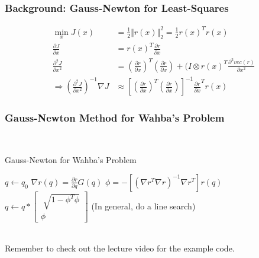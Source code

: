 \subsubsection{Background: Gauss-Newton for Least-Squares}
\begin{align}
    \min_x J(x) & = \frac{1}{2} \Vert r(x) \Vert_2^2 = \frac{1}{2}r(x)^T r(x) \\
    \frac{\partial J}{\partial x} & = r(x)^T \frac{\partial r}{\partial x} \\ 
    \frac{\partial^2 J}{\partial x^2} & = (\frac{\partial r}{\partial x})^T (\frac{\partial r}{\partial x}) + (I \otimes r(x)^T \frac{\partial^2 vec(r)}{\partial x^2} \\
    \Rightarrow (\frac{\partial^2 J}{\partial x^2})^{-1} \nabla J & \approx [(\frac{\partial r}{\partial x})^T (\frac{\partial r}{\partial x})]^{-1} \frac{\partial r}{\partial x}^T r(x)
\end{align}

\subsubsection{Gauss-Newton Method for Wahba's Problem}

\\
\noindent
\begin{algorithm}
	\caption{Gauss-Newton for Wahba's Problem}
	\label{alg:ForwardRollout}
	\begin{algorithmic}[1]	
        \State $q \gets q_0$
            \State $\nabla r(q) = \frac{\partial r}{\partial q} G(q)$ 
            \State $\phi = -[(\nabla r^T \nabla r)^{-1} \nabla r^T] r(q)$
            \State $q \gets q * \begin{bmatrix}
                \sqrt[]{1 - \phi^T \phi} \\ \phi
            \end{bmatrix} $ 
            \State (In general, do a line search)
        \Endwhile
	\end{algorithmic}
\end{algorithm}
\\

Remember to check out the lecture video for the example code.
